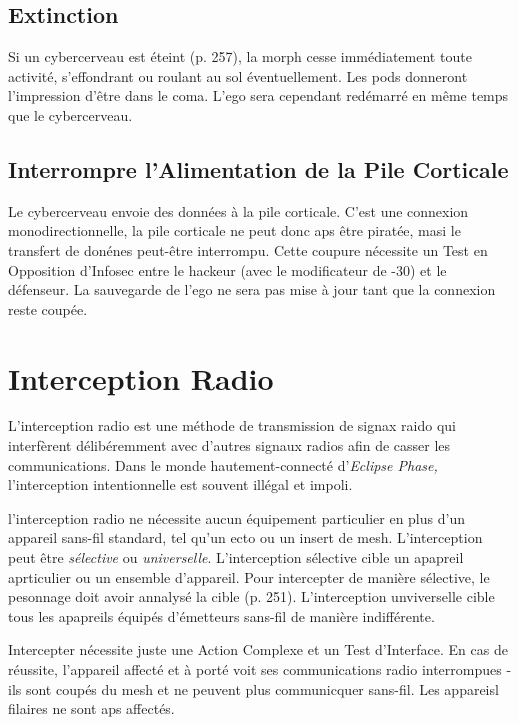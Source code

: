 \subsection{Extinction} 

Si un cybercerveau est éteint (p. 257), la morph cesse immédiatement toute activité, s'effondrant ou roulant au sol éventuellement. Les pods donneront l'impression d'être dans le coma. L'ego sera cependant redémarré en même temps que le cybercerveau. 

\subsection{Interrompre l'Alimentation de la Pile Corticale} 

Le cybercerveau envoie des données à la pile corticale. C'est une connexion monodirectionnelle, la pile corticale ne peut donc aps être piratée, masi le transfert de donénes peut-être interrompu. Cette coupure nécessite un Test en Opposition d'Infosec entre le hackeur (avec le modificateur de -30) et le défenseur. La sauvegarde de l'ego ne sera pas mise à jour tant que la connexion reste coupée. 

\section{Interception Radio} 

L'interception radio est une méthode de transmission de signax raido qui interfèrent délibéremment avec d'autres signaux radios afin de casser les communications. Dans le monde hautement-connecté d'\textit{Eclipse Phase,} l'interception intentionnelle est souvent illégal et impoli. 

l'interception radio ne nécessite aucun équipement particulier en plus d'un appareil sans-fil standard, tel qu'un ecto ou un insert de mesh. L'interception peut être \textit{sélective} ou \textit{universelle}. L'interception sélective cible un apapreil aprticulier ou un ensemble d'appareil. Pour intercepter de manière sélective, le pesonnage doit avoir annalysé la cible (p. 251). L'interception unviverselle cible tous les apapreils équipés d'émetteurs sans-fil de manière indifférente. 

Intercepter nécessite juste une Action Complexe et un Test d'Interface. En cas de réussite, l'appareil affecté et à porté voit ses communications radio interrompues - ils sont coupés du mesh et ne peuvent plus communicquer sans-fil. Les appareisl filaires ne sont aps affectés. 


